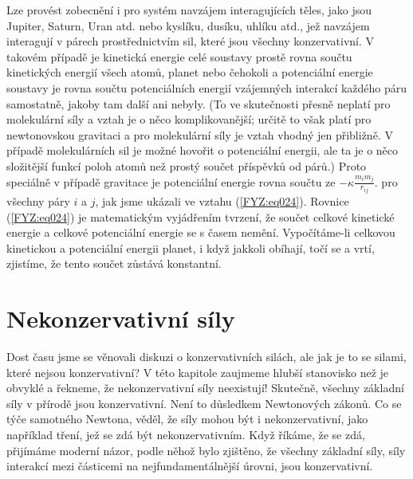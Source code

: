     Lze provést zobecnění i pro systém navzájem interagujících těles, jako jsou Jupiter, Saturn, 
    Uran atd. nebo kyslíku, dusíku, uhlíku atd., jež navzájem interagují v párech prostřednictvím 
    sil, které jsou všechny konzervativní. V takovém případě je kinetická energie celé soustavy 
    prostě rovna součtu kinetických energií všech atomů, planet nebo čehokoli a potenciální energie 
    soustavy je rovna součtu potenciálních energií vzájemných interakcí každého páru samostatně, 
    jakoby tam další ani nebyly. (To ve skutečnosti přesně neplatí pro molekulární síly a vztah je 
    o něco komplikovanější; určitě to však platí pro newtonovskou gravitaci a pro molekulární síly 
    je vztah vhodný jen přibližně. V případě molekulárních sil je možné hovořit o potenciální 
    energii, ale ta je o něco složitější funkcí poloh atomů než prostý součet příspěvků od párů.) 
    Proto speciálně v případě gravitace je potenciální energie rovna součtu ze \(- \kappa 
    \frac{m_im_j}{r_{ij}}.\) pro všechny páry \(i\) a \(j\), jak jsme ukázali ve vztahu 
    (\ref{FYZ:eq024}). Rovnice (\ref{FYZ:eq024}) je matematickým vyjádřením tvrzení, že součet 
    celkové kinetické energie a celkové potenciální energie se s časem nemění. Vypočítáme-li 
    celkovou kinetickou a potenciální energii planet, i když jakkoli obíhají, točí se a vrtí, 
    zjistíme, že tento součet zůstává konstantní.
    
  \section{Nekonzervativní síly}
    Dost času jsme se věnovali diskuzi o konzervativních silách, ale jak je to se silami, které 
    nejsou konzervativní? V této kapitole zaujmeme hlubší stanovisko než je obvyklé a řekneme, že 
    nekonzervativní síly neexistují! Skutečně, všechny základní síly v přírodě jsou konzervativní. 
    Není to důsledkem Newtonových zákonů. Co se týče samotného Newtona, věděl, že síly mohou být i 
    nekonzervativní, jako například tření, jež se zdá být nekonzervativním. Když říkáme, že se zdá, 
    přijímáme moderní názor, podle něhož bylo zjištěno, že všechny základní síly, síly interakcí 
    mezi částicemi na nejfundamentálnější úrovni, jsou konzervativní.
    
